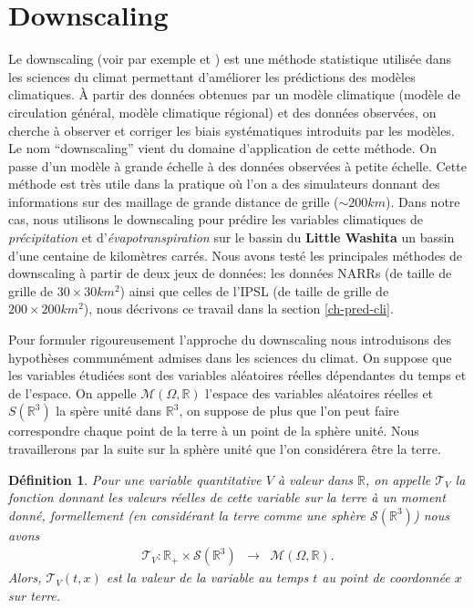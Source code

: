 \documentclass[a4paper,11pt]{article}
\newtheorem{definition}{Définition}
\begin{document}
\newpage
\tableofcontents
\newpage

\section{Downscaling}
\label{dwnsc}
Le downscaling (voir par exemple \cite{vrac2012dynamical} et \cite{ayar2016intercomparison}) est une méthode statistique utilisée dans les sciences du climat permettant d'améliorer les prédictions des modèles climatiques. À partir des données obtenues par un modèle climatique (modèle de circulation général, modèle climatique régional) et des données observées, on cherche à observer et corriger les biais systématiques introduits par les modèles. Le nom ``downscaling'' vient du domaine d'application de cette méthode. On passe d'un modèle à grande échelle à des données observées à petite échelle. Cette méthode est très utile dans la pratique où l'on a des simulateurs donnant des informations sur des maillage de grande distance de grille ($\sim 200km$). Dans notre cas, nous utilisons le downscaling pour prédire les variables climatiques de \textit{précipitation} et d'\textit{évapotranspiration} sur le bassin du \textbf{Little Washita} un bassin d'une centaine de kilomètres carrés. Nous avons testé les principales méthodes de downscaling à partir de deux jeux de données: les données NARRs (de taille de grille de $30\times 30 km^2$) ainsi que celles de l'IPSL (de taille de grille de $200\times200 km^2$), nous décrivons ce travail dans la section \ref{ch-pred-cli}.

Pour formuler rigoureusement l'approche du downscaling nous introduisons des hypothèses communément admises dans les sciences du climat. On suppose que les variables étudiées sont des variables aléatoires réelles dépendantes du temps et de l'espace. On appelle $\mathcal{M}(\Omega,\mathbb{R})$ l'espace des variables aléatoires réelles et $S(\mathbb{R}^3)$ la spère unité dans $\mathbb{R}^3$, on suppose de plus que l'on peut faire correspondre chaque point de la terre à un point de la sphère unité. Nous travaillerons par la suite sur la sphère unité que l'on considérera être la terre.

\begin{definition}
	\label{terre}
	Pour une variable quantitative $V$ à valeur dans $\mathbb{R}$, on appelle $\mathcal{T}_V$ la fonction donnant les  valeurs réelles de cette variable sur la terre à un moment donné, formellement (en considérant la terre comme une sphère $\mathcal{S}(\mathbb{R}^3)$) nous avons
	\begin{equation}
		\begin{array}{ccc}
			\mathcal{T}_V: \mathbb{R}_{+}\times\mathcal{S}(\mathbb{R}^{3}) & \to & \mathcal{M}(\Omega,\mathbb{R}).
		\end{array}
	\end{equation}
	Alors, $\mathcal{T}_V(t,x)$ est la valeur de la variable au temps $t$ au point de coordonnée $x$ sur terre.	
\end{definition}
\end{document}
